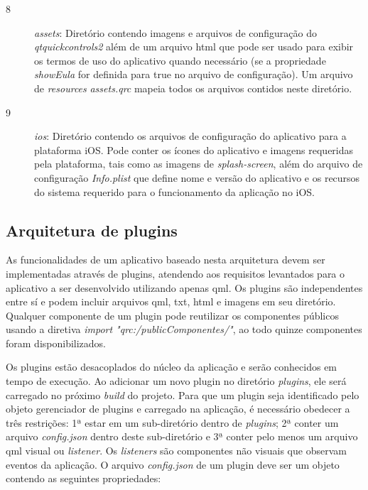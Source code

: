 \begin{description}
	\item[8] \textit{assets}: Diretório contendo imagens e arquivos de configuração do \textit{qtquickcontrols2} além de um arquivo html que pode ser usado para exibir os termos de uso do aplicativo quando necessário (se a propriedade \textit{showEula} for definida para true no arquivo de configuração). Um arquivo de \textit{resources} \textit{assets.qrc} mapeia todos os arquivos contidos neste diretório.

	\item[9] \textit{ios}: Diretório contendo os arquivos de configuração do aplicativo para a plataforma iOS. Pode conter os ícones do aplicativo e imagens requeridas pela plataforma, tais como as imagens de \textit{splash-screen}, além do arquivo de configuração \textit{Info.plist} que define nome e versão do aplicativo e os recursos do sistema requerido para o funcionamento da aplicação no iOS.
\end{description}


\subsection{Arquitetura de plugins}
As funcionalidades de um aplicativo baseado nesta arquitetura devem ser implementadas através de plugins, atendendo aos requisitos levantados para o aplicativo a ser desenvolvido utilizando apenas qml. Os plugins são independentes entre sí e podem incluir arquivos qml, txt, html e imagens em seu diretório. Qualquer componente de um plugin pode reutilizar os componentes públicos usando a diretiva \textit{import "qrc:/publicComponentes/"}, ao todo quinze componentes foram disponibilizados.\par
Os plugins estão desacoplados do núcleo da aplicação e serão conhecidos em tempo de execução. Ao adicionar um novo plugin no diretório \textit{plugins}, ele será carregado no próximo \textit{build} do projeto. Para que um plugin seja identificado pelo objeto gerenciador de plugins e carregado na aplicação, é necessário obedecer a três restrições: 1ª estar em um sub-diretório dentro de \textit{plugins}; 2ª conter um arquivo \textit{config.json} dentro deste sub-diretório e 3ª conter pelo menos um arquivo qml visual ou \textit{listener}. Os \textit{listeners} são componentes não visuais que observam eventos da aplicação. O arquivo \textit{config.json} de um plugin deve ser um objeto contendo as seguintes propriedades:

